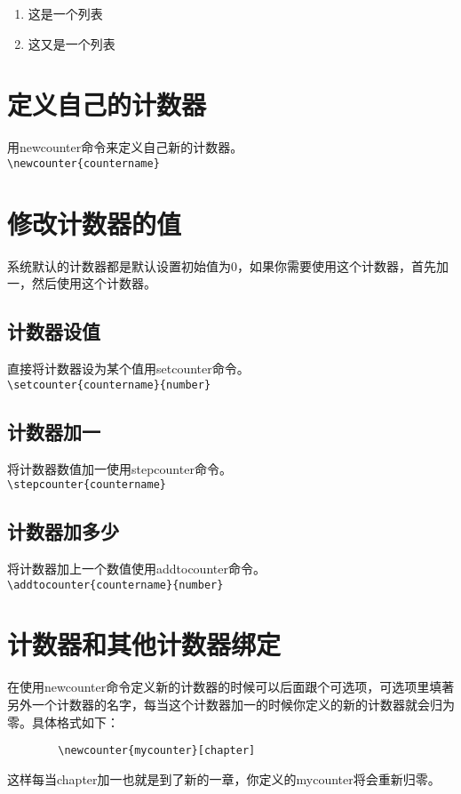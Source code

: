 \documentclass[11pt,oneside]{book}
\begin{document}
      \begin{enumerate}
        \renewcommand{\labelenumi}{\circledarabic{enumi}}
      \item 这是一个列表
      \item 这又是一个列表
      \end{enumerate}

      \section{定义自己的计数器}
      用newcounter命令来定义自己新的计数器。\\
      \verb+\newcounter{countername}+

      \section{修改计数器的值}
      系统默认的计数器都是默认设置初始值为0，如果你需要使用这个计数器，首先加一，然后使用这个计数器。
      \subsection{计数器设值}
      直接将计数器设为某个值用setcounter命令。\\
      \verb+\setcounter{countername}{number}+
      \subsection{计数器加一}
      将计数器数值加一使用stepcounter命令。\\
      \verb+\stepcounter{countername}+

      \subsection{计数器加多少}
      将计数器加上一个数值使用addtocounter命令。\\
      \verb+\addtocounter{countername}{number}+

      \section{计数器和其他计数器绑定}
      在使用newcounter命令定义新的计数器的时候可以后面跟个可选项，可选项里填著另外一个计数器的名字，每当这个计数器加一的时候你定义的新的计数器就会归为零。具体格式如下：
      \begin{Verbatim}
        \newcounter{mycounter}[chapter]
      \end{Verbatim}
      这样每当chapter加一也就是到了新的一章，你定义的mycounter将会重新归零。
\end{document}
